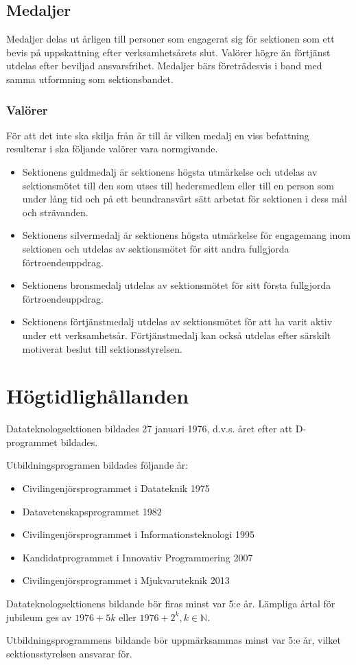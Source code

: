 \documentclass{datateknologsektionen-document}
\begin{document}
\subsection{Medaljer}
Medaljer delas ut årligen till personer som engagerat sig för sektionen som ett
bevis på uppskattning efter verksamhetsårets slut. Valörer högre än förtjänst
utdelas efter beviljad ansvarsfrihet. Medaljer bärs företrädesvis i band med samma
utformning som sektionsbandet.

\subsubsection{Valörer}
För att det inte ska skilja från år till år vilken medalj en viss befattning resulterar
i ska följande valörer vara normgivande.

\begin{itemize}
  \item Sektionens guldmedalj är sektionens högsta utmärkelse och utdelas av sektionsmötet
        till den som utses till hedersmedlem eller till en person som under lång tid och på
        ett beundransvärt sätt arbetat för sektionen i dess mål och strävanden.

  \item Sektionens silvermedalj är sektionens högsta utmärkelse för engagemang inom sektionen
        och utdelas av sektionsmötet för sitt andra fullgjorda förtroendeuppdrag.

  \item Sektionens bronsmedalj utdelas av sektionsmötet för sitt första fullgjorda förtroendeuppdrag.

  \item Sektionens förtjänstmedalj utdelas av sektionsmötet för att ha varit aktiv under ett verksamhetsår.
        Förtjänstmedalj kan också utdelas efter särskilt motiverat beslut till sektionsstyrelsen.
\end{itemize}

\section{Högtidlighållanden}
\label{hogtidshallande}
Datateknologsektionen bildades 27 januari 1976, d.v.s. året efter att D-programmet bildades.

Utbildningsprogramen bildades följande år:
\begin{itemize}
  \item Civilingenjörsprogrammet i Datateknik 1975
  \item Datavetenskapsprogrammet 1982
  \item Civilingenjörsprogrammet i Informationsteknologi 1995
  \item Kandidatprogrammet i Innovativ Programmering 2007
  \item Civilingenjörsprogrammet i Mjukvaruteknik 2013
\end{itemize}

Datateknologsektionens bildande bör firas minst var 5:e år. Lämpliga årtal för jubileum
ges av \(1976 + 5k\) eller \(1976 + 2^k, k \in \mathbb{N}\).

Utbildningsprogrammens bildande bör uppmärksammas minst var 5:e år, vilket sektionsstyrelsen ansvarar för.
\end{document}
